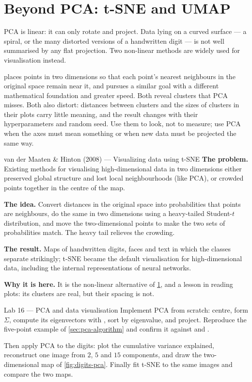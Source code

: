 \section{Beyond PCA: t-SNE and UMAP}
\label{sec:tsne}

PCA is linear: it can only rotate and project. Data lying on a curved surface ---
a spiral, or the many distorted versions of a handwritten digit --- is not well
summarised by any flat projection. Two non-linear methods are widely used for
visualisation instead.

 places points in two dimensions so that each point's nearest
neighbours in the original space remain near it, and  pursues a similar
goal with a different mathematical foundation and greater speed. Both reveal
clusters that PCA misses. Both also distort: distances between clusters and the
sizes of clusters in their plots carry little meaning, and the result changes with
their hyperparameters and random seed. Use them to look, not to measure; use PCA
when the axes must mean something or when new data must be projected the same way.

\begin{researchspotlight}{van der Maaten \& Hinton (2008) --- Visualizing data using t-SNE}
\textbf{The problem.} Existing methods for visualising high-dimensional data in two
dimensions either preserved global structure and lost local neighbourhoods (like
PCA), or crowded points together in the centre of the map.

\textbf{The idea.} Convert distances in the original space into probabilities that
points are neighbours, do the same in two dimensions using a heavy-tailed
Student-$t$ distribution, and move the two-dimensional points to make the two sets
of probabilities match. The heavy tail relieves the crowding.

\textbf{The result.} Maps of handwritten digits, faces and text in which the
classes separate strikingly; t-SNE became the default visualisation for
high-dimensional data, including the internal representations of neural networks.

\textbf{Why it is here.} It is the non-linear alternative of \cref{sec:tsne}, and a
lesson in reading plots: its clusters are real, but their spacing is not.
\parencite{vandermaaten2008}
\end{researchspotlight}

\begin{labbox}{Lab 16 --- PCA and data visualisation}
Implement PCA from scratch: centre, form $\Sigma$, compute its eigenvectors with
, sort by eigenvalue, and project. Reproduce the five-point
example of \cref{sec:pca-algorithm} and confirm it against 
and .

Then apply PCA to the digits: plot the cumulative variance explained, reconstruct
one image from $2$, $5$ and $15$ components, and draw the two-dimensional map of
\cref{fig:digits-pca}. Finally fit t-SNE to the same images and compare the two
maps.
\end{labbox}

